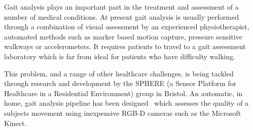 \documentclass[11pt]{article} %
\begin{document}

Gait analysis plays an important part in the treatment and assessment of a number of medical conditions. At present gait analysis is usually performed through a combination of visual assessment by an experienced physiotherapist, automated methods such as marker based motion capture, pressure sensitive walkways or accelerometers. It requires patients to travel to a gait assessment laboratory which is far from ideal for patients who have difficulty walking. 

This problem, and a range of other healthcare challenges, is being tackled through research and development by the SPHERE (a Sensor Platform for Healthcare in a Residential Environment) group in Bristol. An automatic, in home, gait analysis pipeline has been designed~\cite{Paiement,Tao} which assesses the quality of a subjects movement using inexpensive RGB-D cameras such as the Microsoft Kinect.
\end{document}
